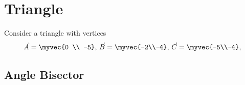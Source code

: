 \documentclass[11pt]{book}
\begin{document}
\frontmatter
\tableofcontents
\setcounter{page}{0}
\mainmatter
\chapter{Triangle}
Consider a triangle with vertices
\begin{align}
\label{eq:tri-pts}
\vec{A}=\myvec{0 \\ -5},\,
\vec{B}=\myvec{-2\\-4},\,
	\vec{C}=\myvec{-5\\-4},\,
\end{align}
\section{Angle Bisector}

\end{document}
